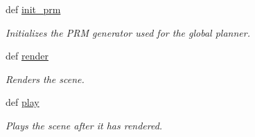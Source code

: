 \begin{DoxyCompactItemize}
def \hyperlink{classboidsimulation_1_1FlockSim_a86097d942af27dc5df9f7190befd363c}{init\-\_\-prm}
\begin{DoxyCompactList}\small\item\em Initializes the P\-R\-M generator used for the global planner. \end{DoxyCompactList}\item 
def \hyperlink{classboidsimulation_1_1FlockSim_a3c456990ff58b2a5dfae2dd2b5b6d294}{render}
\begin{DoxyCompactList}\small\item\em Renders the scene. \end{DoxyCompactList}\item 
def \hyperlink{classboidsimulation_1_1FlockSim_a50ded4dc206f7ae1011347ef234a0091}{play}
\begin{DoxyCompactList}\small\item\em Plays the scene after it has rendered. \end{DoxyCompactList}\end{DoxyCompactItemize}
